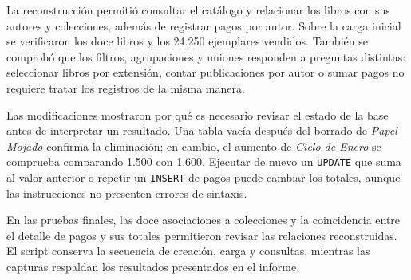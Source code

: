 \documentclass[11pt,a4paper]{article}
\begin{document}
La reconstrucción permitió consultar el catálogo y relacionar los libros con sus autores y colecciones, además de registrar pagos por autor. Sobre la carga inicial se verificaron los doce libros y los 24.250 ejemplares vendidos. También se comprobó que los filtros, agrupaciones y uniones responden a preguntas distintas: seleccionar libros por extensión, contar publicaciones por autor o sumar pagos no requiere tratar los registros de la misma manera.

Las modificaciones mostraron por qué es necesario revisar el estado de la base antes de interpretar un resultado. Una tabla vacía después del borrado de \textit{Papel Mojado} confirma la eliminación; en cambio, el aumento de \textit{Cielo de Enero} se comprueba comparando 1.500 con 1.600. Ejecutar de nuevo un \texttt{UPDATE} que suma al valor anterior o repetir un \texttt{INSERT} de pagos puede cambiar los totales, aunque las instrucciones no presenten errores de sintaxis.

En las pruebas finales, las doce asociaciones a colecciones y la coincidencia entre el detalle de pagos y sus totales permitieron revisar las relaciones reconstruidas. El script conserva la secuencia de creación, carga y consultas, mientras las capturas respaldan los resultados presentados en el informe.
\end{document}

